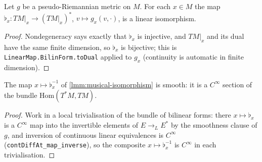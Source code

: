 \begin{lemma}
    \label{lmm:musical-isomorphism}
    \leanok
    Let $g$ be a pseudo-Riemannian metric on $M$. For each $x \in M$ the map $\flat_x : TM|_x \to (TM|_x)^*$, $v \mapsto g_x(v, \cdot)$, is a linear isomorphism.
\end{lemma}
\begin{proof}
    \leanok
    Nondegeneracy says exactly that $\flat_x$ is injective, and $TM|_x$ and its dual have the same finite dimension, so $\flat_x$ is bijective; this is \texttt{LinearMap.BilinForm.toDual} applied to $g_x$ (continuity is automatic in finite dimension).
\end{proof}

\begin{lemma}
    \label{lmm:musical-inverse-smooth}
    \leanok
    The map $x \mapsto \flat_x^{-1}$ of \ref{lmm:musical-isomorphism} is smooth: it is a $C^\infty$ section of the bundle $\mathrm{Hom}(T^*M, TM)$.
\end{lemma}
\begin{proof}
    \leanok
    Work in a local trivialisation of the bundle of bilinear forms: there $x \mapsto \flat_x$ is a $C^\infty$ map into the invertible elements of $E \to_L E^*$ by the smoothness clause of $g$, and inversion of continuous linear equivalences is $C^\infty$ (\texttt{contDiffAt\_map\_inverse}), so the composite $x \mapsto \flat_x^{-1}$ is $C^\infty$ in each trivialisation.
\end{proof}

